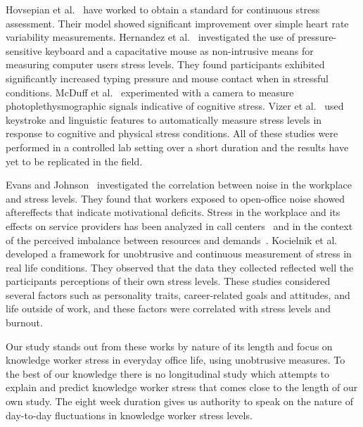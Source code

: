 Hovsepian et al.~\cite{Hovsepian15} have worked to obtain a standard for continuous stress assessment. Their model showed significant improvement over simple heart rate variability measurements.
Hernandez et al.~\cite{Hernandez14} investigated the use of pressure-sensitive keyboard and a capacitative mouse as non-intrusive means for measuring computer users stress levels. They found participants exhibited significantly increased typing pressure and mouse contact when in stressful conditions. McDuff et al.~\cite{mcduff16} experimented with a camera to measure photoplethysmographic signals indicative of cognitive stress. Vizer et al.~\cite{vizer_automated_2009} used keystroke and linguistic features to automatically measure stress levels in response to cognitive and physical stress conditions. All of these studies were performed in a controlled lab setting over a short duration and the results have yet to be replicated in the field.

Evans and Johnson~\cite{evans00} investigated the correlation between noise in the workplace and stress levels. They found that workers exposed to open-office noise showed aftereffects that indicate motivational deficits. Stress in the workplace and its effects on service providers has been analyzed in call centers~\cite{Hernandez11} and in the context of the perceived imbalance between resources and demands~\cite{cherniss80}. Kocielnik et al.~\cite{kocielnik_smart_2013} developed a framework for unobtrusive and continuous measurement of stress in real life conditions. They observed that the data they collected reflected well the participants perceptions of their own stress levels. 
These studies considered several factors such as personality traits, career-related goals and attitudes, and life outside of work, and these factors were correlated with stress levels and burnout.

Our study stands out from these works by nature of its length and focus on knowledge worker stress in everyday office life, using unobtrusive measures. To the best of our knowledge there is no longitudinal study which attempts to explain and predict knowledge worker stress that comes close to the length of our own study. The eight week duration gives us authority to speak on the nature of day-to-day fluctuations in knowledge worker stress levels.


